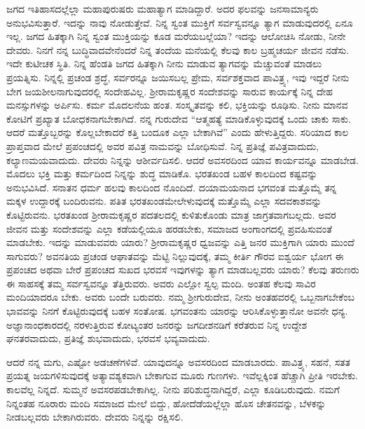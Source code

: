 ಜಗದ ಇತಿಹಾಸದಲ್ಲೆಲ್ಲಾ ಮಹಾಪುರುಷರು ಮಹಾತ್ಯಾಗ ಮಾಡಿದ್ದಾರೆ. ಅದರ ಫಲವನ್ನು ಜನಸಾಮಾನ್ಯರು ಅನುಭವಿಸುತ್ತಾರೆ. ಇದನ್ನು ನಾವು ನೋಡುತ್ತೇವೆ. ನಿನ್ನ ಸ್ವಂತ ಮುಕ್ತಿಗೆ ಸರ್ವಸ್ವವನ್ನೂ ತ್ಯಾಗ ಮಾಡುವುದರಲ್ಲಿ ಏನೂ ಇಲ್ಲ. ಜಗದ ಹಿತಕ್ಕಾಗಿ ನಿನ್ನ ಸ್ವಂತ ಮುಕ್ತಿಯನ್ನು ಕೂಡ ಮರೆಯಬಲ್ಲೆಯಾ? ಇದನ್ನು ಆಲೋಚಿಸಿ ನೋಡು, ನೀನೇ ದೇವರು. ನಿನಗೆ ನನ್ನ ಬುದ್ಧಿವಾದವೇನೆಂದರೆ ನಿನ್ನ ತಂದೆಯ ಮನೆಯಲ್ಲಿ ಕೆಲವು ಕಾಲ ಬ್ರಹ್ಮಚರ್ಯ ಜೀವನ ನಡೆಸು. ಇದೇ ಕುಟೀಚಕ ಸ್ಥಿತಿ. ನಿನ್ನ ಹೆಂಡತಿ ಜಗದ ಹಿತಕ್ಕಾಗಿ ನೀನು ಮಾಡುವ ತ್ಯಾಗವನ್ನು ಮೆಚ್ಚುವಂತೆ ಮಾಡಲು ಪ್ರಯತ್ನಿಸು. ನಿನ್ನಲ್ಲಿ ಪ್ರಚಂಡ ಶ್ರದ್ಧೆ, ಸರ್ವರನ್ನೂ ಜಯಿಸಬಲ್ಲ ಪ್ರೇಮ, ಸರ್ವಶಕ್ತವಾದ ಪಾವಿತ್ರ್ಯ, ಇವು ಇದ್ದರೆ ನೀನು ಬೇಗ ಜಯಶೀಲನಾಗುವುದರಲ್ಲಿ ಸಂದೇಹವಿಲ್ಲ. ಶ‍್ರೀರಾಮಕೃಷ್ಣರ ಸಂದೇಶವನ್ನು ಸಾರುವ ಕಾರ್ಯಕ್ಕೆ ನಿನ್ನ ದೇಹ ಮನಸ್ಸುಗಳನ್ನು ಅರ್ಪಿಸು. ಕರ್ಮ ಮೊದಲನೆಯ ಹಂತ. ಸಂಸ್ಕೃತವನ್ನು ಕಲಿ, ಭಕ್ತಿಯನ್ನು ರೂಢಿಸು. ನೀನು ಮಾನವ ಕೋಟಿಗೆ ಪ್ರಖ್ಯಾತ ಬೋಧಕನಾಗಬೇಕಾಗಿದೆ. ನನ್ನ ಗುರುದೇವ “ಆತ್ಮಹತ್ಯೆ ಮಾಡಿಕೊಳ್ಳುವುದಕ್ಕೆ ಒಂದು ಚಾಕು ಸಾಕು. ಆದರೆ ಮತ್ತೊಬ್ಬರನ್ನು ಕೊಲ್ಲಬೇಕಾದರೆ ಕತ್ತಿ ಬಂದೂಕ ಎಲ್ಲಾ ಬೇಕಾಗಿವೆ” ಎಂದು ಹೇಳುತ್ತಿದ್ದರು. ಸರಿಯಾದ ಕಾಲ ಪ್ರಾಪ್ತವಾದ ಮೇಲೆ ಪ್ರಪಂಚದಲ್ಲಿ ಅವರ ಪವಿತ್ರ ನಾಮವನ್ನು ಬೋಧಿಸುವೆ. ನಿನ್ನ ಪ್ರತಿಜ್ಞೆ ಪವಿತ್ರವಾದುದು, ಕಲ್ಯಾಣಮಯವಾದುದು. ದೇವರು ನಿನ್ನನ್ನು ಆಶೀರ್ವದಿಸಲಿ. ಆದರೆ ಅವಸರದಿಂದ ಯಾವ ಕಾರ್ಯವನ್ನೂ ಮಾಡಬೇಡ. ಮೊದಲು ಭಕ್ತಿ ಮತ್ತು ಕರ್ಮದಿಂದ ನಿನ್ನನ್ನು ಶುದ್ಧ ಮಾಡಿಕೊ. ಭರತಖಂಡ ಬಹಳ ಕಾಲದಿಂದ ಕಷ್ಟವನ್ನು ಅನುಭವಿಸಿದೆ. ಸನಾತನ ಧರ್ಮ ಹಲವು ಕಾಲದಿಂದ ನೊಂದಿದೆ. ದಯಾಮಯನಾದ ಭಗವಂತ ಮತ್ತೊಮ್ಮೆ ತನ್ನ ಮಕ್ಕಳ ಉದ್ದಾರಕ್ಕೆ ಬಂದಿರುವನು. ಪತಿತ ಭರತಖಂಡಮೇಲೇಳುವುದಕ್ಕೆ ಮತ್ತೊಮ್ಮೆ ಎಲ್ಲಾ ಸದವಕಾಶವನ್ನು ಕೊಟ್ಟಿರುವನು. ಭರತಖಂಡ ಶ‍್ರೀರಾಮಕೃಷ್ಣರ ಪದತಲದಲ್ಲಿ ಕುಳಿತುಕೊಂಡು ಮಾತ್ರ ಜಾಗ್ರತವಾಗಬಲ್ಲದು. ಅವರ ಜೀವನ ಮತ್ತು ಸಂದೇಶವನ್ನು ಎಲ್ಲಾ ಕಡೆಯಲ್ಲಿಯೂ ಹರಡಬೇಕು, ಸಮಾಜದ ಅಂಗಾಂಗದಲ್ಲಿ ಪ್ರವಹಿಸುವಂತೆ ಮಾಡಬೇಕು. ಇದನ್ನು ಮಾಡುವವರು ಯಾರು? ಶ‍್ರೀರಾಮಕೃಷ್ಣರ ಧ್ವಜವನ್ನು ಎತ್ತಿ ಜನರ ಮುಕ್ತಿಗಾಗಿ ಯಾರು ಮುಂದೆ ಸಾಗುವರು? ಅವನತಿಯ ಪ್ರಚಂಡ ಆಘಾತವನ್ನು ಮೆಟ್ಟಿ ನಿಲ್ಲುವುದಕ್ಕೆ, ತಮ್ಮ ಕೀರ್ತಿ ಗೌರವ ಐಶ್ವರ್ಯ ಭೋಗ ಈ ಪ್ರಪಂಚದ ಅಥವಾ ಬೇರೆ ಪ್ರಪಂಚದ ಸುಖದ ಭರವಸೆ\enginline{-} ಇವುಗಳನ್ನು ತ್ಯಾಗ ಮಾಡಬಲ್ಲವರು ಯಾರು? ಕೆಲವು ತರುಣರು ಈ ಸಾಹಸಕ್ಕೆ ತಮ್ಮ ಸರ್ವಸ್ವವನ್ನೂ ತೆತ್ತಿರುವರು. ಅವರು ಎಲ್ಲೋ ಸ್ವಲ್ಪ ಮಂದಿ. ಅಂತಹ ಕೆಲವು ಸಾವಿರ ಮಂದಿಯಾದರೂ ಬೇಕು. ಅವರು ಬಂದೇ ಬರುವರು. ನಮ್ಮ ಶ‍್ರೀಗುರುದೇವ, ನೀನು ಅಂತಹವರಲ್ಲಿ ಒಬ್ಬನಾಗಬೇಕೆಂಬ ಭಾವವನ್ನು ನಿನಗೆ ಕೊಟ್ಟಿರುವುದಕ್ಕೆ ಬಹಳ ಸಂತೋಷ. ಭಗವಂತನು ಯಾರನ್ನು ಆರಿಸಿಕೊಳ್ಳುತ್ತಾನೋ ಅವನೇ ಧನ್ಯ. ಅಜ್ಞಾನಾಂಧಕಾರದಲ್ಲಿ ನರಳುತ್ತಿರುವ ಕೋಟ್ಯಂತರ ಜನರನ್ನು ಜಗದೀಶನಡಿಗೆ ಕರೆತರುವ ನಿನ್ನ ಉದ್ದೇಶ ಘನತರವಾದುದು, ಪ್ರತಿಜ್ಞೆ ಶುಭವಾದುದು, ಭರವಸೆ ಭವ್ಯವಾದುದು.
\vspace{0.4cm}

ಆದರೆ ನನ್ನ ಮಗು, ಎಷ್ಟೋ ಅಡಚಣೆಗಳಿವೆ. ಯಾವುದನ್ನೂ ಅವಸರದಿಂದ ಮಾಡಬಾರದು. ಪಾವಿತ್ರ್ಯ, ಸಹನೆ, ಸತತ ಪ್ರಯತ್ನ ಜಯಗಳಿಸುವುದಕ್ಕೆ ಅತ್ಯಾವಶ್ಯಕವಾಗಿ ಬೇಕಾಗುವ ಮೂರು ಗುಣಗಳು. ಇವೆಲ್ಲಕ್ಕಿಂತ ಹೆಚ್ಚಾಗಿ ಪ್ರೀತಿ ಇರಬೇಕು. ಕಾಲವೆಲ್ಲ ನಿನ್ನದೆ. ಸುಮ್ಮನೆ ಅವಸರಪಡಬೇಕಾಗಿಲ್ಲ. ನೀನು ಪರಿಶುದ್ಧನಾಗಿದ್ದರೆ, ಎಲ್ಲಾ ಕೂಡಿಬರುವುದು. ನಮಗೆ ನಿನ್ನಂತಹ ನೂರಾರು ಮಂದಿ ಸಮಾಜದ ಮೇಲೆ ಬಿದ್ದು, ಹೋದೆಡೆ\-ಯಲ್ಲೆಲ್ಲಾ ಹೊಸ ಚೇತನವನ್ನು, ಬೆಳಕನ್ನು ನೀಡಬಲ್ಲವರು ಬೇಕಾಗಿರುವರು. ದೇವರು ನಿನ್ನನ್ನು ರಕ್ಷಿಸಲಿ.

